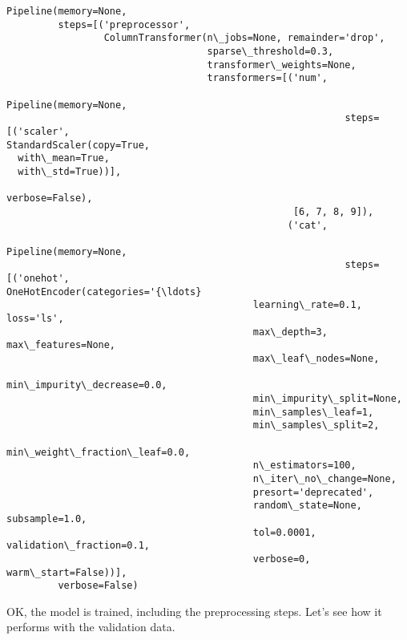 \documentclass[11pt]{article}
\begin{document}
    \begin{Verbatim}[commandchars=\\\{\}]
Pipeline(memory=None,
         steps=[('preprocessor',
                 ColumnTransformer(n\_jobs=None, remainder='drop',
                                   sparse\_threshold=0.3,
                                   transformer\_weights=None,
                                   transformers=[('num',
                                                  Pipeline(memory=None,
                                                           steps=[('scaler',
StandardScaler(copy=True,
  with\_mean=True,
  with\_std=True))],
                                                           verbose=False),
                                                  [6, 7, 8, 9]),
                                                 ('cat',
                                                  Pipeline(memory=None,
                                                           steps=[('onehot',
OneHotEncoder(categories='{\ldots}
                                           learning\_rate=0.1, loss='ls',
                                           max\_depth=3, max\_features=None,
                                           max\_leaf\_nodes=None,
                                           min\_impurity\_decrease=0.0,
                                           min\_impurity\_split=None,
                                           min\_samples\_leaf=1,
                                           min\_samples\_split=2,
                                           min\_weight\_fraction\_leaf=0.0,
                                           n\_estimators=100,
                                           n\_iter\_no\_change=None,
                                           presort='deprecated',
                                           random\_state=None, subsample=1.0,
                                           tol=0.0001, validation\_fraction=0.1,
                                           verbose=0, warm\_start=False))],
         verbose=False)
    \end{Verbatim}

    OK, the model is trained, including the preprocessing steps. Let's see
how it performs with the validation data.
\end{document}
